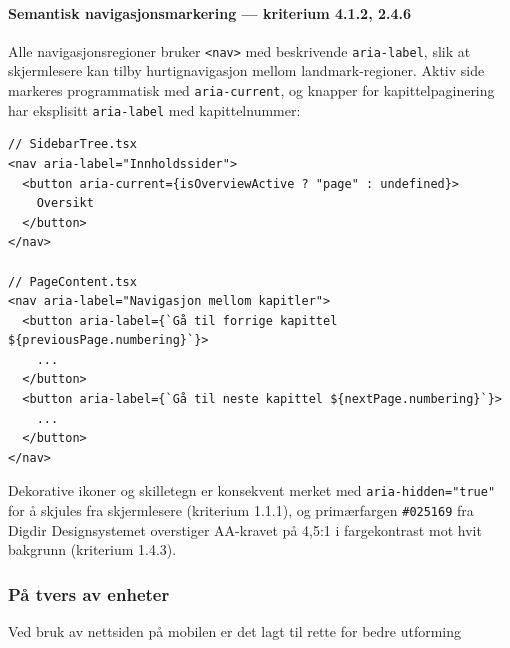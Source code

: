 \paragraph{Semantisk navigasjonsmarkering --- kriterium 4.1.2, 2.4.6}
Alle navigasjonsregioner bruker \texttt{<nav>} med beskrivende
\texttt{aria-label}, slik at skjermlesere kan tilby hurtignavigasjon
mellom landmark-regioner. Aktiv side markeres programmatisk med
\texttt{aria-current}, og knapper for kapittelpaginering har eksplisitt
\texttt{aria-label} med kapittelnummer:

\begin{verbatim}
// SidebarTree.tsx
<nav aria-label="Innholdssider">
  <button aria-current={isOverviewActive ? "page" : undefined}>
    Oversikt
  </button>
</nav>

// PageContent.tsx
<nav aria-label="Navigasjon mellom kapitler">
  <button aria-label={`Gå til forrige kapittel ${previousPage.numbering}`}>
    ...
  </button>
  <button aria-label={`Gå til neste kapittel ${nextPage.numbering}`}>
    ...
  </button>
</nav>
\end{verbatim}

Dekorative ikoner og skilletegn er konsekvent merket med
\texttt{aria-hidden="true"} for å skjules fra skjermlesere (kriterium
1.1.1), og primærfargen \texttt{\#025169} fra Digdir Designsystemet
overstiger AA-kravet på 4,5:1 i fargekontrast mot hvit bakgrunn
(kriterium 1.4.3).

\subsubsection{På tvers av enheter}
Ved bruk av nettsiden på mobilen er det lagt til rette for bedre utforming